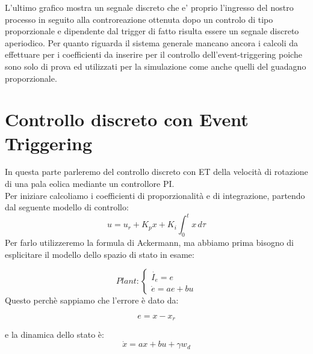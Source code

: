 \documentclass[a4paper,13pt]{article}
\begin{document}
L'ultimo grafico mostra un segnale discreto che e' proprio l'ingresso del nostro processo in seguito alla controreazione ottenuta dopo un controlo di tipo proporzionale e dipendente dal trigger di fatto  risulta essere un segnale discreto aperiodico.
Per quanto riguarda il sistema generale mancano ancora i calcoli da effettuare per i coefficienti da inserire per il controllo dell'event-triggering poiche sono solo di prova ed utilizzati per la simulazione come anche quelli del guadagno proporzionale.


\section{Controllo discreto con Event Triggering}

	In questa parte parleremo del controllo discreto con ET della velocità di rotazione di una pala eolica mediante un
	controllore PI.\\
	Per iniziare calcoliamo i coefficienti di proporzionalità e di integrazione, partendo dal seguente modello di  			    controllo:\\
\begin{equation*}
	u=u_{r}+K_{p}x+K_{i}\int_{0}^{t} x \, d\tau              %
\end{equation*}	
	Per farlo utilizzeremo la formula di Ackermann, ma abbiamo prima bisogno di esplicitare il modello dello spazio di
	stato in esame:

\[Plant	:
\begin{cases}
	
	\dot{I_{e}}= e \\
	\dot{e} = ae + bu
	
\end{cases}\]
	Questo perchè sappiamo che l'errore è dato da:

\begin{equation*}
	e=x-x_{r}          %
\end{equation*}
	
	e la dinamica dello stato è:
\begin{equation*}
	\dot{x}=ax+bu+\gamma w_{d}    %
\end{equation*} \\
	
\end{document}
